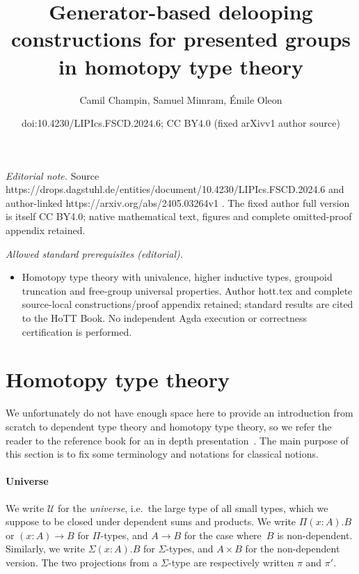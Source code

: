 \documentclass[10pt,a4paper]{amsart}
\title{Generator-based delooping constructions for presented groups in homotopy type theory}
\author{Camil Champin, Samuel Mimram, Émile Oleon}
\date{doi:10.4230/LIPIcs.FSCD.2024.6; CC BY4.0 (fixed arXivv1 author source)}
\theoremstyle{definition}
\newcommand{\fst}{\pi}
\newcommand{\snd}{\pi'}
\newcommand{\U}{\mathcal{U}} %
\newcommand{\ie}{i.e.~}
\begin{document}
\maketitle
\setcounter{section}{1}
\noindent\textit{Editorial note.} Source https://drops.dagstuhl.de/entities/document/10.4230/LIPIcs.FSCD.2024.6 and author-linked https://arxiv.org/abs/2405.03264v1 . The fixed author full version is itself CC BY4.0; native mathematical text, figures and complete omitted-proof appendix retained.\par\medskip
\noindent\textit{Allowed standard prerequisites (editorial).}\begin{itemize}
\item Homotopy type theory with univalence, higher inductive types, groupoid truncation and free-group universal properties. Author hott.tex and complete source-local constructions/proof appendix retained; standard results are cited to the HoTT Book. No independent Agda execution or correctness certification is performed.
\end{itemize}\medskip
\section{Homotopy type theory}
\label{hott}
We unfortunately do not have enough space here to provide an introduction from
scratch to dependent type theory and homotopy type theory, so we refer the reader
to the reference book for an in depth presentation~\cite{hottbook}. The main
purpose of this section is to fix some terminology and notations for classical
notions.

\paragraph{Universe}
We write $\U$ for the \emph{universe}, \ie the large type of all small types,
which we suppose to be closed under dependent sums and products. We write
$\Pi(x:A).B$ or $(x:A)\to B$ for $\Pi$-types, and $A\to B$ for the case
where~$B$ is non-dependent. Similarly, we write $\Sigma(x:A).B$ for
$\Sigma$-types, and $A\times B$ for the non-dependent version. The two
projections from a $\Sigma$-type are respectively written $\fst$ and $\snd$.
\end{document}
